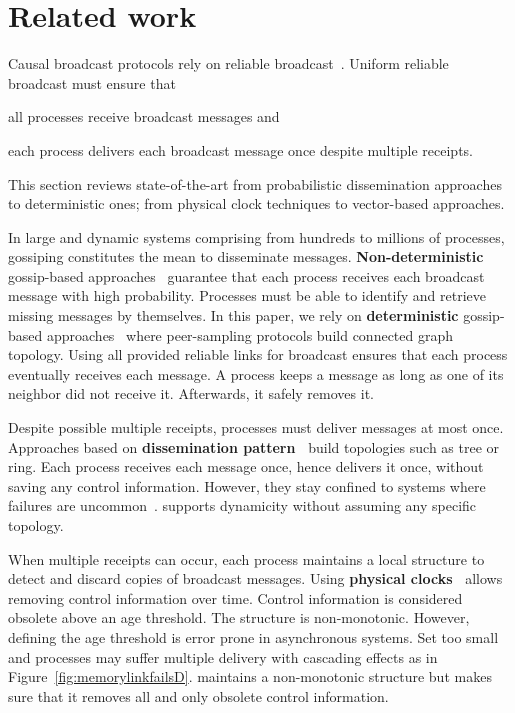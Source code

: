
\section{Related work}
\label{sec:relatedwork}

Causal broadcast protocols rely on reliable
broadcast~\cite{hadzilacos1994modular}. Uniform reliable broadcast must ensure
that
\begin{inparaenum}[(i)]
\item all processes receive broadcast messages and
\item each process delivers each broadcast message once despite multiple
  receipts.
\end{inparaenum} This section reviews state-of-the-art from probabilistic
dissemination approaches to deterministic ones; from physical clock techniques
to vector-based approaches.

In large and dynamic systems comprising from hundreds to millions of processes,
gossiping constitutes the mean to disseminate
messages. \textbf{Non-deterministic} gossip-based
approaches~\cite{birman1999bimodal,demers1987epidemic} guarantee that each
process receives each broadcast message with high probability. Processes must be
able to identify and retrieve missing messages by themselves. In this paper, we
rely on \textbf{deterministic} gossip-based
approaches~\cite{friedman2004causal,nedelec2017adaptive} where peer-sampling
protocols build connected graph topology. Using all provided reliable links for
broadcast ensures that each process eventually receives each message. A process
keeps a message as long as one of its neighbor did not receive it. Afterwards,
it safely removes it.

Despite possible multiple receipts, processes must deliver messages at most
once. Approaches based on \textbf{dissemination
  pattern~\cite{bravo2017saturn,raynal2013distributed}} build topologies such as
tree or ring. Each process receives each message once, hence delivers it once,
without saving any control information. However, they stay confined to systems
where failures are uncommon~\cite{krasikova2016hashtable}. \RPCBROADCAST
supports dynamicity without assuming any specific topology. 

When multiple receipts can occur, each process maintains a local structure to
detect and discard copies of broadcast messages. Using \textbf{physical
  clocks~\cite{cachin2011introduction,demers1987epidemic}} allows removing
control information over time. Control information is considered obsolete above
an age threshold. The structure is non-monotonic. However, defining the age
threshold is error prone in asynchronous systems. Set too small and processes
may suffer multiple delivery with cascading effects as in
Figure~\ref{fig:memorylinkfailsD}.  \RPCBROADCAST maintains a non-monotonic
structure but makes sure that it removes all and only obsolete control
information.


